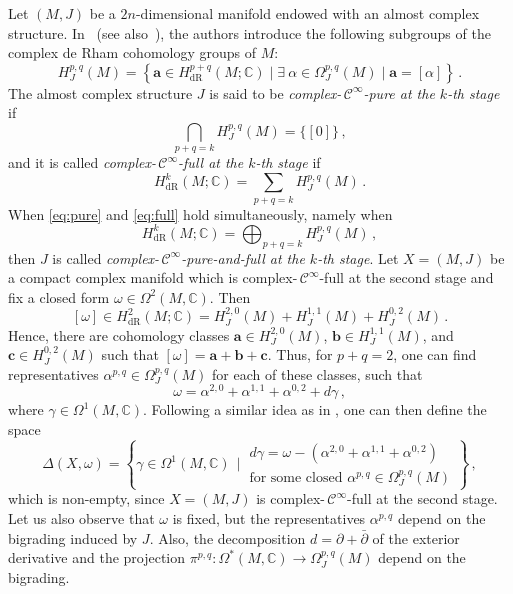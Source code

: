 \documentclass[a4paper]{amsart}
\theoremstyle{definition}
\theoremstyle{remark}
\numberwithin{equation}{section}
\begin{document}
Let $(M,J)$ be a $2n$-dimensional manifold endowed with an almost complex structure. In~\cite{angella-tomassini-2} (see also~\cite{li-zhang}), the authors introduce the following subgroups of the complex de Rham cohomology groups of $M$:
\[
H^{p,q}_J(M)=\left\{ \mathbf a\in H_{\text{dR}}^{p+q}(M;\mathbb C) \mid \exists \ \alpha\in\Omega_J^{p,q}(M) \mid \mathbf a=[\alpha] \right\}\,.    
\]
The almost complex structure $J$ is said to be 
\emph{complex-\,$\mathcal C^{\infty}$-pure at the $k$-th stage} if
\begin{equation}\label{eq:pure}
\bigcap_{p+q=k}\!\!\!H^{p,q}_J(M)=\big\{[0]\big\}\,,
\end{equation}
and it is called \emph{complex-\,$\mathcal C^{\infty}$-full at the $k$-th stage} if
\begin{equation}\label{eq:full}
H_{\text{dR}}^{k}(M;\mathbb C)=\sum_{p+q=k}H^{p,q}_J(M)\,.    
\end{equation}
When \eqref{eq:pure} and \eqref{eq:full} hold simultaneously, namely when 
\[
H_{\text{dR}}^{k}(M;\mathbb C)=\bigoplus_{p+q=k}H^{p,q}_J(M)\,,
\]
then $J$ is called \emph{complex-\,$\mathcal C^{\infty}$-pure-and-full at the $k$-th stage}. 
\medskip
Let $X=(M,J)$ be a compact complex manifold which is complex-\,$\mathcal C^{\infty}$-full at the second stage and fix a closed form $\omega\in\Omega^2(M,\mathbb C)$. Then
\[
[\omega]\in H_{\text{dR}}^2(M;\mathbb C)=H^{2,0}_J(M)+H^{1,1}_J(M)+H^{0,2}_J(M)\,.
\]
Hence, there are cohomology classes $\mathbf a\in H^{2,0}_J(M)$, $\mathbf b\in H^{1,1}_J(M)$,
and $\mathbf c\in H^{0,2}_J(M)$ such that $[\omega]=\mathbf a+\mathbf b+\mathbf c$. Thus, for $p+q=2$, one can find representatives $\alpha^{p,q}\in\Omega_J^{p,q}(M)$ for each of these classes, such that
\[
\omega=\alpha^{2,0}+\alpha^{1,1}+\alpha^{0,2}+d\gamma\,,
\]
where $\gamma\in\Omega^1(M,\mathbb C)$. Following a similar idea as in \cite{latorre-ugarte-proc}, one can then define the space
\[
\Delta(X,\omega)=\left\{ \gamma\in\Omega^1(M,\mathbb C)
	\ \ \Big\vert \ \begin{array}{c}
		d\gamma=\omega-(\alpha^{2,0}+\alpha^{1,1}+\alpha^{0,2}) \\
		\text{for some closed }\alpha^{p,q}\in\Omega_J^{p,q}(M) 
	\end{array}\right\}\,,
\]
which is non-empty, since $X=(M,J)$ is complex-\,$\mathcal C^{\infty}$-full at the second stage. Let us also observe that $\omega$ is fixed, but the representatives $\alpha^{p,q}$ depend on the bigrading induced by $J$. Also, the decomposition $d=\partial+\bar\partial$ of the exterior derivative and the projection 
$\pi^{p,q}\colon\Omega^*(M,\mathbb C)\to\Omega^{p,q}_J(M)$ depend on the bigrading.
\end{document}
